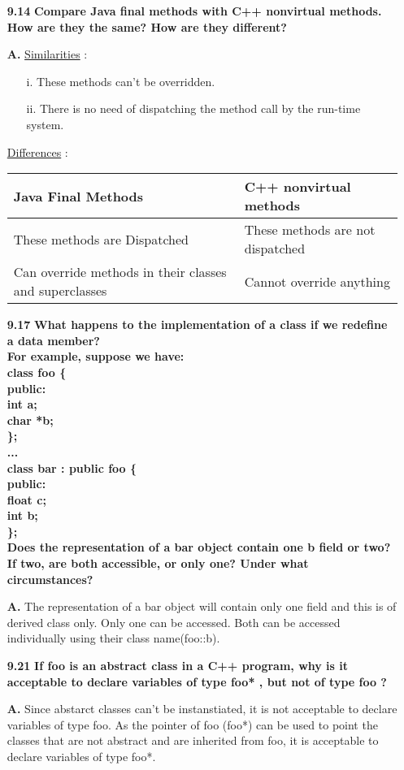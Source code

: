 \documentclass[letterpaper]{article}
\begin{document}
\begin{large}
\begin{flushleft}
\begin{enumerate}
\item[\textbf{9.14}]
\textbf{Compare Java final methods with C++ nonvirtual methods. How are they
the same? How are they different?}
\item[\textbf{A.}]
\underline{Similarities} :\\
\begin{enumerate}
\item[i.] These methods can't be overridden.
\item[ii.] There is no need of dispatching the method call by the run-time system. 
\end{enumerate}
\underline{Differences} :\\
\begin{tabular}{| m{8.55cm} | m{8.55cm} |}
\hline
\textbf{Java Final Methods} & \textbf{C++ nonvirtual methods}\\
\hline
These methods are Dispatched & These methods are not dispatched\\
\hline
Can override methods in their classes and superclasses & Cannot override anything\\
\hline
\end{tabular}
\item[\textbf{9.17}]
\textbf{What happens to the implementation of a class if we redefine a data member?\\
For example, suppose we have:\\
class foo \{\\
public:\\
int a;\\
char *b;\\
\};\\
...\\
class bar : public foo \{\\
public:\\
float c;\\
int b;\\
\};\\
Does the representation of a bar object contain one b field or two? If two,
are both accessible, or only one? Under what circumstances?}
\item[\textbf{A.}]
The representation of a bar object will contain only one field and this is of derived class only. Only one can be accessed. Both can be accessed individually using their class name(foo::b).

\item[\textbf{9.21}]
\textbf{If foo is an abstract class in a C++ program, why is it acceptable to declare variables of type foo* , but not of type foo ?}
\item[\textbf{A.}]
Since abstarct classes can't be instanstiated, it is not acceptable to declare variables of type foo. As the pointer of foo (foo*) can be used to point the classes that are not abstract and are inherited from foo, it is acceptable to declare variables of type foo*.

\end{enumerate}
\end{flushleft}
\end{large}
\end{document}
